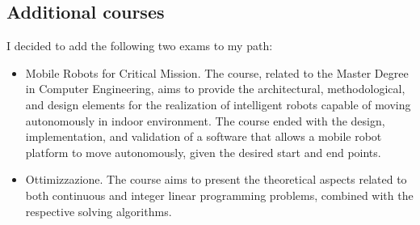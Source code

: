 \subsection{Additional courses}
I decided to add the following two exams to my path:
\begin{itemize}
    \item Mobile Robots for Critical Mission. The course, related to the Master Degree in Computer Engineering, aims to provide the architectural, methodological, and design elements for the realization of intelligent robots capable of moving autonomously in indoor environment. The course ended with the design, implementation, and validation of a software that allows a mobile robot platform to move autonomously, given the desired start and end points.
    \item Ottimizzazione. The course aims to present the theoretical aspects related to both continuous and integer linear programming problems, combined with the respective solving algorithms.
\end{itemize}